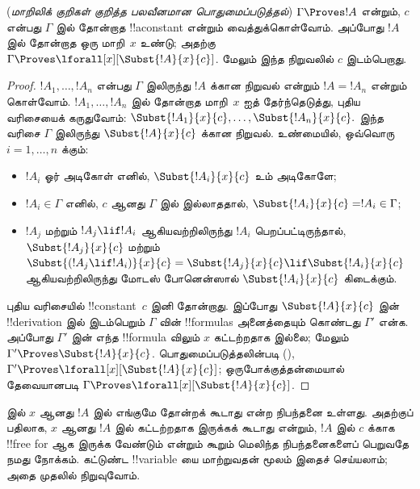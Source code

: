 \documentclass[../../../include/open-logic-section]{subfiles}
\begin{document}
\begin{thm} (\emph{மாறிலிக் குறிகள் குறித்த பலவீனமான
பொதுமைப்படுத்தல்})
$\Gamma \Proves !A$ என்றும், $c$ என்பது $\Gamma$ இல் தோன்றாத
!!a{constant} என்றும் வைத்துக்கொள்வோம். அப்போது $!A$ இல் தோன்றாத
ஒரு மாறி~$x$ உண்டு; அதற்கு $\Gamma \Proves
\lforall[x][\Subst{!A}{x}{c}]$. மேலும் இந்த நிறுவலில் $c$ இடம்பெறாது.
\end{thm}

\begin{proof} $!A_1,\ldots,!A_n$ என்பது $\Gamma$ இலிருந்து $!A$ க்கான
நிறுவல் என்றும் $!A=!A_n$ என்றும் கொள்வோம். $!A_1,\ldots,!A_n$ இல்
தோன்றாத மாறி~$x$ ஐத் தேர்ந்தெடுத்து, புதிய வரிசையைக் கருதுவோம்:
$\Subst{!A_1}{x}{c},\ldots,\Subst{!A_n}{x}{c}.$
இந்த வரிசை $\Gamma$ இலிருந்து $\Subst{!A}{x}{c}$ க்கான நிறுவல்.
உண்மையில், ஒவ்வொரு $i=1,\ldots,n$ க்கும்:
\begin{itemize}
\item $!A_i$ ஓர் அடிகோள் எனில், $\Subst{!A_i}{x}{c}$ உம் அடிகோளே;
\item $!A_i \in \Gamma$ எனில், $c$ ஆனது $\Gamma$ இல் இல்லாததால்,
$\Subst{!A_i}{x}{c} = !A_i \in \Gamma$;
\item $!A_j$ மற்றும் $!A_j \lif !A_i$ ஆகியவற்றிலிருந்து $!A_i$
பெறப்பட்டிருந்தால், $\Subst{!A_j}{x}{c}$ மற்றும்
$\Subst{(!A_j \lif !A_i)}{x}{c}
= \Subst{!A_j}{x}{c} \lif \Subst{!A_i}{x}{c}$ ஆகியவற்றிலிருந்து
மோடஸ் போனென்ஸால் $\Subst{!A_i}{x}{c}$ கிடைக்கும்.
\end{itemize}
புதிய வரிசையில் !!{constant}~$c$ இனி தோன்றாது. இப்போது
$\Subst{!A}{x}{c}$ இன் !!{derivation} இல் இடம்பெறும் $\Gamma$ வின்
!!{formula}s அனைத்தையும் கொண்டது $\Gamma'$ என்க. அப்போது $\Gamma'$ இன்
எந்த !!{formula} விலும் $x$ கட்டற்றதாக இல்லை; மேலும் $\Gamma'
\Proves \Subst{!A}{x}{c}$. பொதுமைப்படுத்தலின்படி
(), $\Gamma'
\Proves \lforall[x][\Subst{!A}{x}{c}]$; ஒருபோக்குத்தன்மையால்
தேவையானபடி $\Gamma \Proves \lforall[x][\Subst{!A}{x}{c}]$.
\end{proof}

\begin{explain}
 இல் $x$ ஆனது $!A$ இல் எங்குமே தோன்றக் கூடாது
என்ற நிபந்தனை உள்ளது. அதற்குப் பதிலாக, $x$ ஆனது $!A$ இல் கட்டற்றதாக
இருக்கக் கூடாது என்றும், $!A$ இல் $c$ க்காக !!{free for} ஆக இருக்க
வேண்டும் என்றும் கூறும் மெலிந்த நிபந்தனைகளைப் பெறுவதே நமது நோக்கம்.
கட்டுண்ட !!{variable} யை மாற்றுவதன் மூலம் இதைச் செய்யலாம்; அதை முதலில்
நிறுவுவோம்.
\end{explain}
\end{document}
